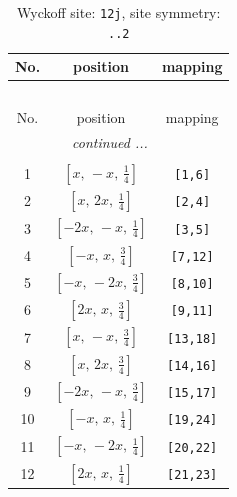\documentclass[fleqn,8pt]{jsarticle}
\begin{document}
\begin{longtable}{ccc}
\caption{Wyckoff site: {\tt 12j}, site symmetry: {\tt ..2}}
 \\
 \hline \hline
No. & position & mapping \\ \hline \endfirsthead

\multicolumn{2}{l}{\tablename\ \thetable{}} \\
 \hline \hline
No. & position & mapping \\ \hline \endhead

 \hline \hline
\multicolumn{2}{r}{\footnotesize\it continued ...} \\ \endfoot

 \hline \hline
\multicolumn{2}{r}{} \\ \endlastfoot

1 & $\left[ x,\, - x,\, \frac{1}{4} \right]$ & {\tt [1,6]} \\ \hline
2 & $\left[ x,\, 2 x,\, \frac{1}{4} \right]$ & {\tt [2,4]} \\ \hline
3 & $\left[ - 2 x,\, - x,\, \frac{1}{4} \right]$ & {\tt [3,5]} \\ \hline
4 & $\left[ - x,\, x,\, \frac{3}{4} \right]$ & {\tt [7,12]} \\ \hline
5 & $\left[ - x,\, - 2 x,\, \frac{3}{4} \right]$ & {\tt [8,10]} \\ \hline
6 & $\left[ 2 x,\, x,\, \frac{3}{4} \right]$ & {\tt [9,11]} \\ \hline
7 & $\left[ x,\, - x,\, \frac{3}{4} \right]$ & {\tt [13,18]} \\ \hline
8 & $\left[ x,\, 2 x,\, \frac{3}{4} \right]$ & {\tt [14,16]} \\ \hline
9 & $\left[ - 2 x,\, - x,\, \frac{3}{4} \right]$ & {\tt [15,17]} \\ \hline
10 & $\left[ - x,\, x,\, \frac{1}{4} \right]$ & {\tt [19,24]} \\ \hline
11 & $\left[ - x,\, - 2 x,\, \frac{1}{4} \right]$ & {\tt [20,22]} \\ \hline
12 & $\left[ 2 x,\, x,\, \frac{1}{4} \right]$ & {\tt [21,23]} \\
\end{longtable}
\renewcommand{\arraystretch}{1.2}
\end{document}
